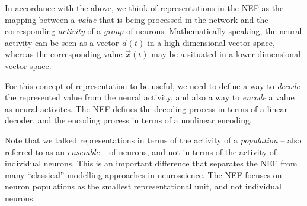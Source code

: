 \documentclass[10pt,letterpaper,oneside]{article}
\begin{document}
In accordance with the above, we think of representations in the NEF as the mapping between a \emph{value} that is being processed in the network and the corresponding \emph{activity} of a \emph{group} of neurons. Mathematically speaking, the neural activity can be seen as a vector $\vec a(t)$ in a high-dimensional vector space, whereas the corresponding value $\vec x(t)$ may be a situated in a lower-dimensional vector space.

For this concept of representation to be useful, we need to define a way to \emph{decode} the represented value from the neural activity, and also a way to \emph{encode} a value as neural activites. The NEF defines the decoding process in terms of a linear decoder, and the encoding process in terms of a nonlinear encoding.

Note that we talked representations in terms of the activity of a \emph{population} -- also referred to as an \emph{ensemble} -- of neurons, and not in terms of the activity of individual neurons. This is an important difference that separates the NEF from many \enquote{classical} modelling approaches in neuroscience. The NEF focuses on neuron populations as the smallest representational unit, and not individual neurons.

\newpage

\end{document}

